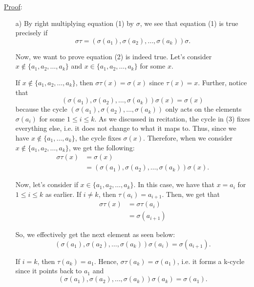 \documentclass{article}
\begin{document}
\underline{Proof}: 
\begin{enumerate}
	\item[a)] By right multiplying equation (1) by $\sigma$, we see that equation (1)  is true precisely if
	\begin{equation}
		\sigma \tau = (\sigma(a_1), \sigma(a_2), \ldots, \sigma(a_k)) \sigma.
	\end{equation}
	
	Now, we want to prove equation (2) is indeed true. Let's consider \\ $x \not \in \{a_1, a_2, \ldots, a_k \}$ and $x\in \{a_1,a_2,\ldots,a_k\}$ for some $x$.
	
	If $x \not \in \{a_1, a_2, \ldots, a_k \}$, then $\sigma \tau (x) = \sigma(x)$ since $\tau(x) = x$. 	Further, notice that
\begin{equation}
	(\sigma(a_1), \sigma(a_2), \ldots, \sigma(a_k)) \sigma (x) = \sigma(x)
\end{equation}
because the cycle $(\sigma(a_1), \sigma(a_2), \ldots, \sigma(a_k))$ only acts on the elements $\sigma(a_i)$ for some $1 \le i \le k$. As we discussed in recitation, the cycle in (3) fixes everything else, i.e. it does not change to what it maps to. Thus, since we have $x\not\in\{a_1,\ldots,a_k\}$, the cycle fixes $\sigma(x)$. Therefore, when we consider $x \not \in \{a_1, a_2, \ldots, a_k \}$, we get the following:
\begin{align*}
	\sigma\tau (x) &= \sigma(x) \\
	&= (\sigma(a_1), \sigma(a_2), \ldots, \sigma(a_k))\sigma (x).
\end{align*}	

Now, let's consider if $x \in \{a_1, a_2, \ldots, a_k\}$. In this case, we have that $x = a_i$ for $1 \le i \le k$ as earlier. If $i \neq k$, then $\tau(a_i) = a_{i+1}$. Then, we get that
\begin{align*}
	\sigma\tau (x) &= \sigma\tau (a_i) \\
	&= \sigma(a_{i+1})
\end{align*}

So, we effectively get the next element as seen below: $$(\sigma(a_1), \sigma(a_2), \ldots, \sigma(a_k))\sigma(a_i) = \sigma(a_{i+1}).$$

If $i = k$, then $\tau(a_k) = a_1$. Hence, $\sigma\tau (a_k) = \sigma(a_1)$, i.e. it forms a k-cycle since it points back to $a_1$ and 
$$(\sigma(a_1), \sigma(a_2), \ldots, \sigma(a_k))\sigma(a_k) = \sigma(a_{1}).$$
            

\end{enumerate}
\end{document}
